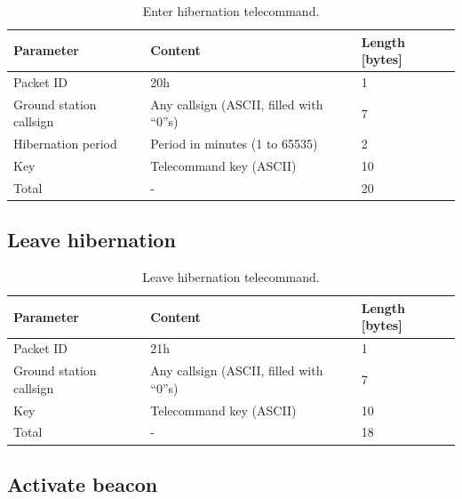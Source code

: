 \begin{table}[!h]
    \centering
    \begin{tabular}{lll}
        \toprule[1.5pt]
        \textbf{Parameter}      & \textbf{Content}                         & \textbf{Length [bytes]} \\
        \midrule
        Packet ID               & 20h                                      & 1 \\
        Ground station callsign & Any callsign (ASCII, filled with ``0''s) & 7 \\
        Hibernation period      & Period in minutes (1 to 65535)           & 2 \\
        Key                     & Telecommand key (ASCII)                  & 10 \\
        \midrule
        Total                   & -                                        & 20 \\
        \bottomrule[1.5pt]
    \end{tabular}
    \caption{Enter hibernation telecommand.}
    \label{tab:enter-hibernation-tc}
\end{table}

\subsection{Leave hibernation}

\begin{table}[!h]
    \centering
    \begin{tabular}{lll}
        \toprule[1.5pt]
        \textbf{Parameter}      & \textbf{Content}                         & \textbf{Length [bytes]} \\
        \midrule
        Packet ID               & 21h                                      & 1 \\
        Ground station callsign & Any callsign (ASCII, filled with ``0''s) & 7 \\
        Key                     & Telecommand key (ASCII)                  & 10 \\
        \midrule
        Total                   & -                                        & 18 \\
        \bottomrule[1.5pt]
    \end{tabular}
    \caption{Leave hibernation telecommand.}
    \label{tab:leave-hibernation-tc}
\end{table}

\subsection{Activate beacon}

